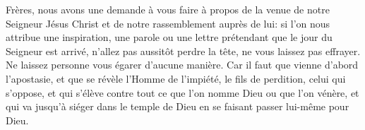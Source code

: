 Frères, nous avons une demande à vous faire
	à propos de la venue de notre Seigneur Jésus Christ
	et de notre rassemblement auprès de lui:
	si l'on nous attribue une inspiration, une parole ou une lettre
	prétendant que le jour du Seigneur est arrivé,
	n'allez pas aussitôt perdre la tête, ne vous laissez pas effrayer.
Ne laissez personne vous égarer d’aucune manière.
Car il faut que vienne d’abord l’apostasie,
	et que se révèle l’Homme de l’impiété, le fils de perdition,
		celui qui s’oppose,
	et qui s’élève contre tout ce que l’on nomme Dieu ou que l’on vénère,
	et qui va jusqu’à siéger dans le temple de Dieu
		en se faisant passer lui-même pour Dieu.
